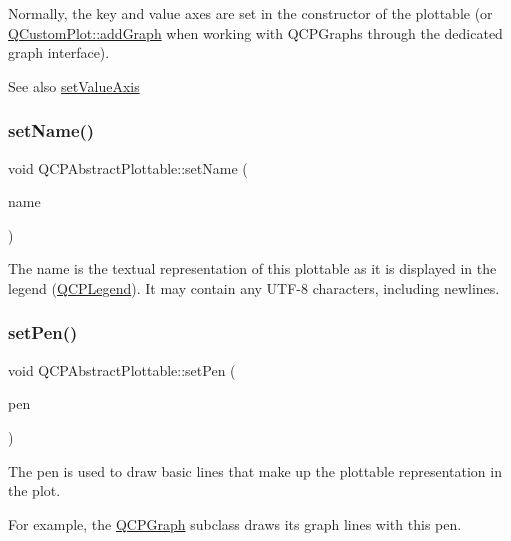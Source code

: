 Normally, the key and value axes are set in the constructor of the plottable (or \hyperlink{classQCustomPlot_a6fb2873d35a8a8089842d81a70a54167}{Q\+Custom\+Plot\+::add\+Graph} when working with Q\+C\+P\+Graphs through the dedicated graph interface).

\begin{DoxySeeAlso}{See also}
\hyperlink{classQCPAbstractPlottable_a71626a07367e241ec62ad2c34baf21cb}{set\+Value\+Axis} 
\end{DoxySeeAlso}
\mbox{\label{classQCPAbstractPlottable_ab79c7ba76bc7fa89a4b3580e12149f1f}} 
\subsubsection{\texorpdfstring{set\+Name()}{setName()}}
{\footnotesize\ttfamily void Q\+C\+P\+Abstract\+Plottable\+::set\+Name (\begin{DoxyParamCaption}\item[{const Q\+String \&}]{name }\end{DoxyParamCaption})}

The name is the textual representation of this plottable as it is displayed in the legend (\hyperlink{classQCPLegend}{Q\+C\+P\+Legend}). It may contain any U\+T\+F-\/8 characters, including newlines. \mbox{\label{classQCPAbstractPlottable_ab74b09ae4c0e7e13142fe4b5bf46cac7}} 
\subsubsection{\texorpdfstring{set\+Pen()}{setPen()}}
{\footnotesize\ttfamily void Q\+C\+P\+Abstract\+Plottable\+::set\+Pen (\begin{DoxyParamCaption}\item[{const Q\+Pen \&}]{pen }\end{DoxyParamCaption})}

The pen is used to draw basic lines that make up the plottable representation in the plot.

For example, the \hyperlink{classQCPGraph}{Q\+C\+P\+Graph} subclass draws its graph lines with this pen.

